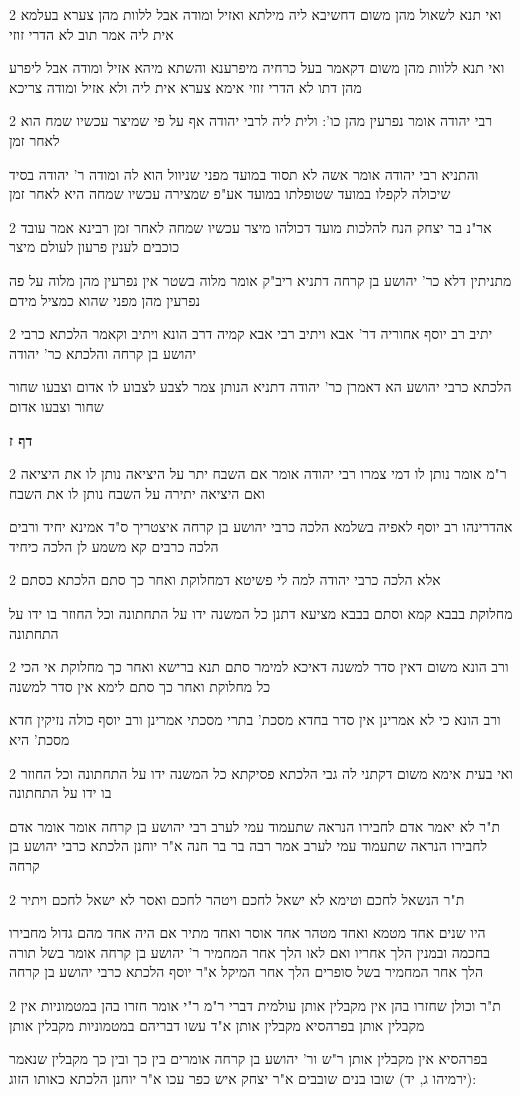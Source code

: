 \documentclass[12pt, openany]{book}
\newcommand{\sethebfont}{
\fontsize{10.5pt}{21.0pt} \selectfont
}
\newcommand{\twocol}[1]{
	{\sethebfont \begin{multicols}{2}
			#1
	\end{multicols}}	
}
\newcommand{\sectname}{}
\newcommand{\newsection}[1]{
	\addcontentsline{toc}{section}{#1}
	\renewcommand{\sectname}{#1}	
	\vspace{-\baselineskip}
	\begin{center}
		\textbf{%
\fontsize{16pt}{16pt}\selectfont
			#1}
	\end{center}
	\vspace{-\baselineskip}
	\nopagebreak
}
\begin{document}
\twocol{ואי תנא לשאול מהן משום דחשיבא ליה מילתא ואזיל ומודה אבל ללוות מהן צערא בעלמא אית ליה אמר תוב לא הדרי זוזי
\par ואי תנא ללוות מהן משום דקאמר בעל כרחיה מיפרענא והשתא מיהא אזיל ומודה אבל ליפרע מהן דתו לא הדרי זוזי אימא צערא אית ליה ולא אזיל ומודה צריכא}
\twocol{רבי יהודה אומר נפרעין מהן כו': ולית ליה לרבי יהודה אף על פי שמיצר עכשיו שמח הוא לאחר זמן
\par והתניא רבי יהודה אומר אשה לא תסוד במועד מפני שניוול הוא לה ומודה ר' יהודה בסיד שיכולה לקפלו במועד שטופלתו במועד אע"פ שמצירה עכשיו שמחה היא לאחר זמן}
\twocol{אר"נ בר יצחק הנח להלכות מועד דכולהו מיצר עכשיו שמחה לאחר זמן רבינא אמר עובד כוכבים לענין פרעון לעולם מיצר
\par מתניתין דלא כר' יהושע בן קרחה דתניא ריב"ק אומר מלוה בשטר אין נפרעין מהן מלוה על פה נפרעין מהן מפני שהוא כמציל מידם}
\twocol{יתיב רב יוסף אחוריה דר' אבא ויתיב רבי אבא קמיה דרב הונא ויתיב וקאמר הלכתא כרבי יהושע בן קרחה והלכתא כר' יהודה
\par הלכתא כרבי יהושע הא דאמרן כר' יהודה דתניא הנותן צמר לצבע לצבוע לו אדום וצבעו שחור שחור וצבעו אדום}
\newsection{דף ז}
\twocol{ר"מ אומר נותן לו דמי צמרו רבי יהודה אומר אם השבח יתר על היציאה נותן לו את היציאה ואם היציאה יתירה על השבח נותן לו את השבח
\par אהדרינהו רב יוסף לאפיה בשלמא הלכה כרבי יהושע בן קרחה איצטריך ס"ד אמינא יחיד ורבים הלכה כרבים קא משמע לן הלכה כיחיד}
\twocol{אלא הלכה כרבי יהודה למה לי פשיטא דמחלוקת ואחר כך סתם הלכתא כסתם
\par מחלוקת בבבא קמא וסתם בבבא מציעא דתנן כל המשנה ידו על התחתונה וכל החוזר בו ידו על התחתונה}
\twocol{ורב הונא משום דאין סדר למשנה דאיכא למימר סתם תנא ברישא ואחר כך מחלוקת אי הכי כל מחלוקת ואחר כך סתם לימא אין סדר למשנה
\par ורב הונא כי לא אמרינן אין סדר בחדא מסכת' בתרי מסכתי אמרינן ורב יוסף כולה נזיקין חדא מסכת' היא}
\twocol{ואי בעית אימא משום דקתני לה גבי הלכתא פסיקתא כל המשנה ידו על התחתונה וכל החוזר בו ידו על התחתונה
\par ת"ר לא יאמר אדם לחבירו הנראה שתעמוד עמי לערב רבי יהושע בן קרחה אומר אומר אדם לחבירו הנראה שתעמוד עמי לערב אמר רבה בר בר חנה א"ר יוחנן הלכתא כרבי יהושע בן קרחה}
\twocol{ת"ר הנשאל לחכם וטימא לא ישאל לחכם ויטהר לחכם ואסר לא ישאל לחכם ויתיר
\par היו שנים אחד מטמא ואחד מטהר אחד אוסר ואחד מתיר אם היה אחד מהם גדול מחבירו בחכמה ובמנין הלך אחריו ואם לאו הלך אחר המחמיר ר' יהושע בן קרחה אומר בשל תורה הלך אחר המחמיר בשל סופרים הלך אחר המיקל א"ר יוסף הלכתא כרבי יהושע בן קרחה}
\twocol{ת"ר וכולן שחזרו בהן אין מקבלין אותן עולמית דברי ר"מ ר"י אומר חזרו בהן במטמוניות אין מקבלין אותן בפרהסיא מקבלין אותן א"ד עשו דבריהם במטמוניות מקבלין אותן
\par בפרהסיא אין מקבלין אותן ר"ש ור' יהושע בן קרחה אומרים בין כך ובין כך מקבלין שנאמר (ירמיהו ג, יד) שובו בנים שובבים א"ר יצחק איש כפר עכו א"ר יוחנן הלכתא כאותו הזוג:}
\end{document}
